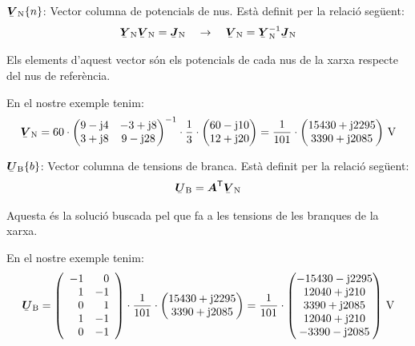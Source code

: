 \begin{list}{}
   \item[$\mcmplx{V}\ped{N}\{n\}$:] Vector columna de potencials de nus. Est\`{a} definit per la relaci\'{o} seg\"{u}ent:
   \begin{equation}
      \mcmplx{Y}\ped{N} \mcmplx{V}\ped{N} = \mcmplx{J}\ped{N} \quad\rightarrow\quad
      \mcmplx{V}\ped{N} = \mcmplx{Y}\ped{N}^{-1} \mcmplx{J}\ped{N} \label{eq:vn}
   \end{equation}

   Els elements d'aquest vector s\'{o}n els potencials de cada nus de la xarxa respecte del nus de refer\`{e}ncia.

   En el nostre exemple tenim:
   \[
      \mcmplx{V}\ped{N} = 60 \cdot
      \begin{pmatrix}
            9 - \ju 4 & -3 + \ju 8 \\
            3 + \ju 8 & 9 - \ju 28
      \end{pmatrix} ^{-1} \cdot
      \frac{1}{3} \cdot \begin{pmatrix}
            60 - \ju 10 \\
            12 + \ju 20
      \end{pmatrix}
      =
      \frac{1}{101} \cdot \begin{pmatrix}
            15430 + \ju 2295 \\
            3390 + \ju 2085
      \end{pmatrix}\unit{V}
      \label{eq:vn_exemp}
   \]

   \item[$\mcmplx{U}\ped{B}\{b\}$:] Vector columna de tensions de branca. Est\`{a} definit per la relaci\'{o} seg\"{u}ent:
   \begin{equation}
      \mcmplx{U}\ped{B} = \transp{\boldsymbol{A}} \mcmplx{V}\ped{N} \label{eq:ur}
   \end{equation}

   Aquesta \'{e}s la soluci\'{o} buscada pel que fa a les tensions de les branques de la xarxa.

   En el nostre exemple tenim:
   \[
      \mcmplx{U}\ped{B} =
      \left(\begin{array}{rr} -1 & 0 \\ 1  & -1 \\  0 & 1 \\ 1 & -1 \\ 0 & -1
      \end{array}\right) \cdot
      \frac{1}{101} \cdot \begin{pmatrix}
            15430 + \ju 2295 \\
            3390 + \ju 2085
      \end{pmatrix} =
      \frac{1}{101} \cdot \begin{pmatrix}
            -15430 - \ju 2295 \\
            12040 + \ju 210  \\
            3390 + \ju 2085 \\
            12040 + \ju 210  \\
            -3390 - \ju 2085
      \end{pmatrix}\unit{V}
   \]


\end{list}
